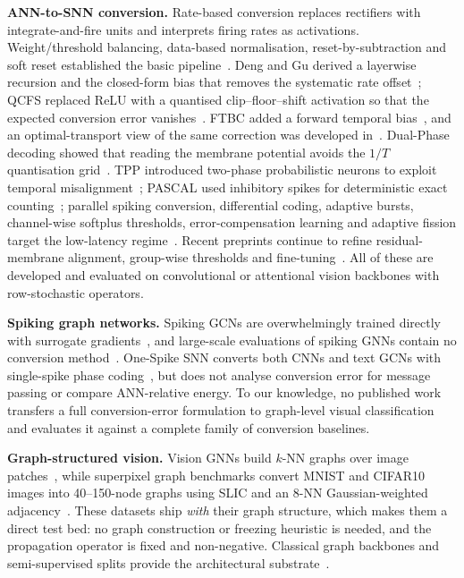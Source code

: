 \textbf{ANN-to-SNN conversion.} Rate-based conversion replaces rectifiers with integrate-and-fire units and interprets firing rates as activations. Weight/threshold balancing, data-based normalisation, reset-by-subtraction and soft reset established the basic pipeline~\cite{diehl2015,rueckauer2017,sengupta2019,han2020rmp}. Deng and Gu derived a layerwise recursion and the closed-form bias that removes the systematic rate offset~\cite{deng2021}; QCFS replaced ReLU with a quantised clip--floor--shift activation so that the expected conversion error vanishes~\cite{bu2022qcfs}. FTBC added a forward temporal bias~\cite{wu2024ftbc}, and an optimal-transport view of the same correction was developed in~\cite{bojkovic2024ot}. Dual-Phase decoding showed that reading the membrane potential avoids the $1/T$ quantisation grid~\cite{dualphase2024}. TPP introduced two-phase probabilistic neurons to exploit temporal misalignment~\cite{bojkovic2025tpp}; PASCAL used inhibitory spikes for deterministic exact counting~\cite{ramesh2025pascal}; parallel spiking conversion, differential coding, adaptive bursts, channel-wise softplus thresholds, error-compensation learning and adaptive fission target the low-latency regime~\cite{hao2025parallel,huang2025dcgs,wang2025adafire,yang2025csqcfs,liu2025ecl,jiang2025fission}. Recent preprints continue to refine residual-membrane alignment, group-wise thresholds and fine-tuning~\cite{chen2026rmp,ji2026gtdl,xia2026neuro}. All of these are developed and evaluated on convolutional or attentional vision backbones with row-stochastic operators.

\textbf{Spiking graph networks.} Spiking GCNs are overwhelmingly trained directly with surrogate gradients~\cite{neftci2019,fang2023spikingjelly}, and large-scale evaluations of spiking GNNs contain no conversion method~\cite{sgnnbench2025}. One-Spike SNN converts both CNNs and text GCNs with single-spike phase coding~\cite{hwang2025onespike}, but does not analyse conversion error for message passing or compare ANN-relative energy. To our knowledge, no published work transfers a full conversion-error formulation to graph-level visual classification and evaluates it against a complete family of conversion baselines.

\textbf{Graph-structured vision.} Vision GNNs build $k$-NN graphs over image patches~\cite{han2022vig,knyazev2019}, while superpixel graph benchmarks convert MNIST and CIFAR10 images into 40--150-node graphs using SLIC and an 8-NN Gaussian-weighted adjacency~\cite{dwivedi2023,achanta2012}. These datasets ship \emph{with} their graph structure, which makes them a direct test bed: no graph construction or freezing heuristic is needed, and the propagation operator is fixed and non-negative. Classical graph backbones and semi-supervised splits provide the architectural substrate~\cite{kipf2017,velickovic2018,hamilton2017,yang2016planetoid}.

